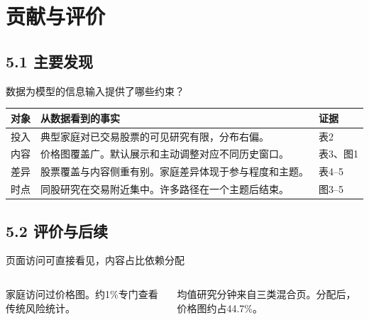 \section{贡献与评价}
\subsection{5.1 主要发现}
\begin{frame}{数据为模型的信息输入提供了哪些约束？}
  {\small\begin{tabularx}{\linewidth}{@{}L{.13\linewidth}YL{.19\linewidth}@{}}
    \toprule
    \textbf{对象} & \textbf{从数据看到的事实} & \textbf{证据}\\
    \midrule
    投入 & 典型家庭对已交易股票的可见研究有限，分布右偏。 & 表2\\
    内容 & 价格图覆盖广。默认展示和主动调整对应不同历史窗口。 & 表3、图1\\
    差异 & 股票覆盖与内容侧重有别。家庭差异体现于参与程度和主题。 & 表4–5\\
    时点 & 同股研究在交易附近集中。许多路径在一个主题后结束。 & 图3–5\\
    \bottomrule
  \end{tabularx}}
\end{frame}

\subsection{5.2 评价与后续}
\begin{frame}{页面访问可直接看见，内容占比依赖分配}
  \begin{columns}[T,onlytextwidth]
      \par
      \par
      {\small 家庭访问过价格图。约1\%专门查看传统风险统计。}
      \par
      \par
      {\small 均值研究分钟来自三类混合页。分配后，价格图约占44.7\%。}
  \end{columns}
  \medskip
\end{frame}

